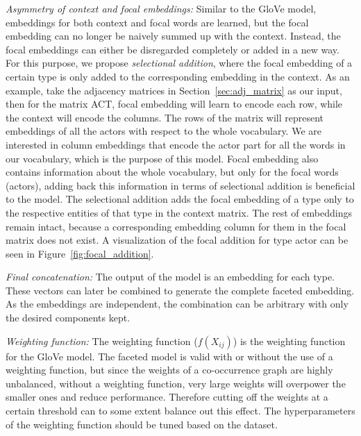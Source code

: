 \begin{compactitem}
\item \emph{Asymmetry of context and focal embeddings:} Similar to the GloVe model, embeddings for both context and focal words are learned, but the focal embedding can no longer be naively summed up with the context. Instead, the focal embeddings can either be disregarded completely or added in a new way. For this purpose, we propose \emph{selectional addition}, where the focal embedding of a certain type is only added to the corresponding embedding in the context. As an example, take the adjacency matrices in Section~\ref{sec:adj_matrix} as our input, then for the matrix ACT,  focal embedding will learn to encode each row, while the context will encode the columns. The rows of the matrix will represent embeddings of all the actors with respect to the whole vocabulary. We are interested in column embeddings that encode the actor part for all the words in our vocabulary, which is the purpose of this model. Focal embedding also contains information about the whole vocabulary, but only for the focal words (actors), adding back this information in terms of selectional addition is beneficial to the model. The selectional addition adds the focal embedding of a type only to the respective entities of that type in the context matrix. The rest of embeddings remain intact, because a corresponding embedding column for them in the focal matrix does not exist. A visualization of the focal addition for type actor can be seen in Figure~\ref{fig:focal_addition}.\\

\item \emph{Final concatenation:} The output of the model is an embedding for each type. These vectors can later be combined to generate the complete faceted embedding. As the embeddings are independent, the combination can be arbitrary with only the desired components kept. \\

\item \emph{Weighting function:} The weighting function ($f(X_{ij})$) is the weighting function for the GloVe model. The faceted model is valid with or without the use of a weighting function, but since the weights of a co-occurrence graph are highly unbalanced, without a weighting function, very large weights will overpower the smaller ones and reduce performance. Therefore cutting off the weights at a certain threshold can to some extent balance out this effect. The hyperparameters of the weighting function should be tuned based on the dataset.\\


\end{compactitem}
